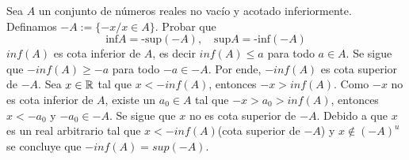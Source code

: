 \item Sea $A$ un conjunto de números reales no vacío y acotado inferiormente. Definamos $-A:=\{-x/x\in A\}$. Probar que \[\text{inf}A=\text{-sup}(-A),\quad\text{sup}A=\text{-inf}(-A)\]
    $inf(A)$ es cota inferior de $A$, es decir $inf(A)\leq a$ para todo $a\in A$. Se sigue que $-inf(A)\geq-a$ para todo $-a\in-A$. Por ende, $-inf(A)$ es cota superior de $-A$. Sea $x\in\mathbb{R}$ tal que $x<-inf(A)$, entonces $-x>inf(A)$. Como $-x$ no es cota inferior de $A$, existe un $a_0\in A$ tal que $-x>a_0>inf(A)$, entonces $x<-a_0$ y $-a_0\in -A$. Se sigue que $x$ no es cota superior de $-A$. Debido a que $x$ es un real arbitrario tal que $x<-inf(A)$(cota superior de $-A$) y $x\notin (-A)^u$ se concluye que $-inf(A)=sup(-A)$. 